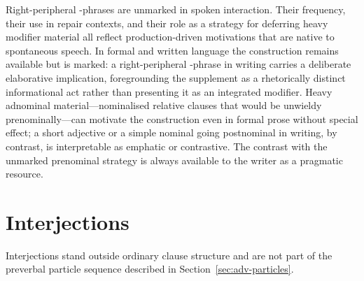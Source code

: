 Right-peripheral -phrases are unmarked in spoken interaction. Their
frequency, their use in repair contexts, and their role as a strategy for
deferring heavy modifier material all reflect production-driven motivations that
are native to spontaneous speech. In formal and written language the
construction remains available but is marked: a right-peripheral -phrase
in writing carries a deliberate elaborative implication, foregrounding the
supplement as a rhetorically distinct informational act rather than presenting
it as an integrated modifier. Heavy adnominal material---nominalised relative
clauses that would be unwieldy prenominally---can motivate the construction even
in formal prose without special effect; a short adjective or a simple nominal
going postnominal in writing, by contrast, is interpretable as emphatic or
contrastive. The contrast with the unmarked prenominal strategy is always
available to the writer as a pragmatic resource.

\section{Interjections}

Interjections stand outside ordinary clause structure and are not part of the
preverbal particle sequence described in Section~\ref{sec:adv-particles}.
